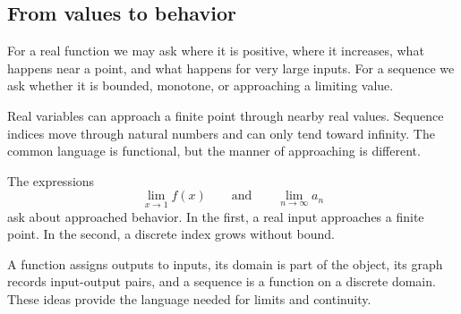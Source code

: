 \subsection{From values to behavior}

For a real function we may ask where it is positive, where it increases, what happens near a point, and what happens for very large inputs. For a sequence we ask whether it is bounded, monotone, or approaching a limiting value.

\begin{corebox}
Real variables can approach a finite point through nearby real values. Sequence indices move through natural numbers and can only tend toward infinity. The common language is functional, but the manner of approaching is different.
\end{corebox}

\begin{examplebox}
The expressions
\[
\lim_{x\to1}f(x)
\qquad\text{and}\qquad
\lim_{n\to\infty}a_n
\]
ask about approached behavior. In the first, a real input approaches a finite point. In the second, a discrete index grows without bound.
\end{examplebox}

\begin{summarybox}
A function assigns outputs to inputs, its domain is part of the object, its graph records input-output pairs, and a sequence is a function on a discrete domain. These ideas provide the language needed for limits and continuity.
\end{summarybox}
